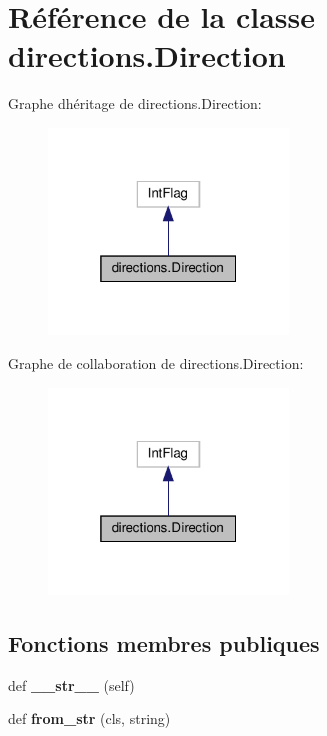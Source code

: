 \hypertarget{classdirections_1_1Direction}{}\section{Référence de la classe directions.\+Direction}
\label{classdirections_1_1Direction}


Graphe d\textquotesingle{}héritage de directions.\+Direction\+:\nopagebreak
\begin{figure}[H]
\begin{center}
\leavevmode
\includegraphics[width=181pt]{classdirections_1_1Direction__inherit__graph}
\end{center}
\end{figure}


Graphe de collaboration de directions.\+Direction\+:\nopagebreak
\begin{figure}[H]
\begin{center}
\leavevmode
\includegraphics[width=181pt]{classdirections_1_1Direction__coll__graph}
\end{center}
\end{figure}
\subsection*{Fonctions membres publiques}
\begin{DoxyCompactItemize}
\item 
\mbox{\label{classdirections_1_1Direction_aba6a03a0ea2b8173c63b7961f12ab28b}} 
def {\bfseries \+\_\+\+\_\+str\+\_\+\+\_\+} (self)
\item 
\mbox{\label{classdirections_1_1Direction_ad3605045e9180a055012bcb7a99df303}} 
def {\bfseries from\+\_\+str} (cls, string)
\end{DoxyCompactItemize}
